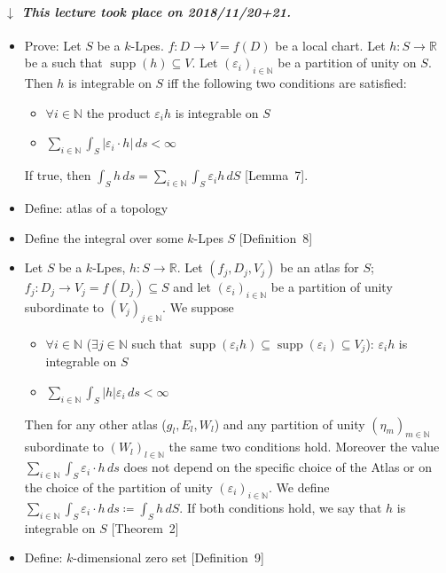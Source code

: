 \documentclass{article}
\numberwithin{lecref}{section}
\newcommand{\Abs}[1]{\left|#1\right|}
\newcommand{\dateref}[1]{%
  \begin{mdframed}[backgroundcolor=gray!10,innerbottommargin=0pt,innertopmargin=0pt]
    \paragraph{\textit{$\downarrow$ This lecture took place on #1.}}%
  \end{mdframed}%
}
\begin{document}
\dateref{2018/11/20+21}

\begin{itemize}
  \item Prove: Let $S$ be a $k$-Lpes. $f: D \to V = f(D)$ be a local chart. Let $h: S \to \mathbb R$ be a such that $\operatorname{supp}(h) \subseteq V$. Let $(\varepsilon_i)_{i \in \mathbb N}$ be a partition of unity on $S$. Then $h$ is integrable on $S$ iff the following two conditions are satisfied:
  \begin{itemize}
    \item $\forall i \in \mathbb N$ the product $\varepsilon_i h$ is integrable on $S$
    \item $\sum_{i \in \mathbb N} \int_S \Abs{\varepsilon_i \cdot h} \, ds < \infty$
  \end{itemize}
  If true, then $\int_S h \,ds = \sum_{i \in \mathbb N} \int_S \varepsilon_i h \, dS$ [Lemma~7].
  \item Define: atlas of a topology
  \item Define the integral over some $k$-Lpes $S$ [Definition~8]
  \item Let $S$ be a $k$-Lpes, $h: S \to \mathbb R$. Let $(f_j, D_j, V_j)$ be an atlas for $S$; $f_j: D_j \to V_j = f(D_j) \subseteq S$ and let $(\varepsilon_i)_{i \in \mathbb N}$ be a partition of unity subordinate to $(V_j)_{j \in \mathbb N}$. We suppose
    \begin{itemize}
      \item $\forall i \in \mathbb N$ ($\exists j \in \mathbb N$ such that $\operatorname{supp}(\varepsilon_i h) \subseteq \operatorname{supp}(\varepsilon_i) \subseteq V_j$): $\varepsilon_i h$ is integrable on $S$
      \item $\sum_{i \in \mathbb N} \int_S \Abs{h} \varepsilon_i \, ds < \infty$
    \end{itemize}
    Then for any other atlas ($g_l, E_l, W_l$) and any partition of unity $(\eta_m)_{m \in \mathbb N}$ subordinate to $(W_l)_{l \in \mathbb N}$ the same two conditions hold. Moreover the value $\sum_{i \in \mathbb N} \int_S \varepsilon_i \cdot h \, ds$ does not depend on the specific choice of the Atlas or on the choice of the partition of unity $(\varepsilon_i)_{i \in \mathbb N}$. We define $\sum_{i \in \mathbb N} \int_S \varepsilon_i \cdot h \, ds \coloneqq \int_S h \, dS$. If both conditions hold, we say that $h$ is integrable on $S$ [Theorem~2]
  \item Define: $k$-dimensional zero set [Definition~9]
\end{itemize}
\end{document}
